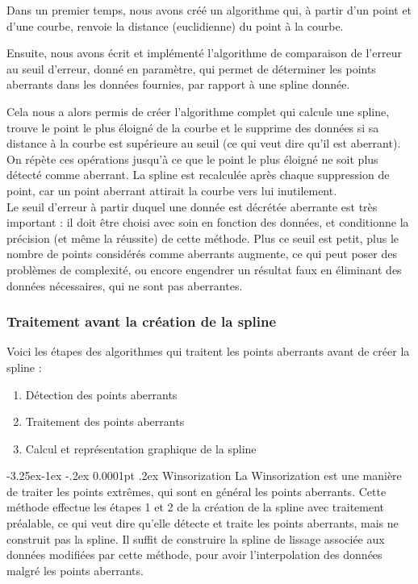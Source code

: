 \documentclass[a4paper,12pt]{article} %
\makeatletter
\renewcommand\paragraph{\@startsection{paragraph}{4}{\z@}%
                                      {-3.25ex\@plus -1ex \@minus -.2ex}%
                                      {0.0001pt \@plus .2ex}%
                                      {\normalfont\normalsize\bfseries}}
\makeatother
\begin{document}
			   
                Dans un premier temps, nous avons créé un algorithme qui, à partir d'un point et d'une courbe, renvoie la distance (euclidienne) du point à la courbe.
                
                Ensuite, nous avons écrit et implémenté l'algorithme de comparaison de l'erreur au seuil d'erreur, donné en paramètre, qui permet de déterminer les points aberrants dans les données fournies, par rapport à une spline donnée.
                
                Cela nous a alors permis de créer l'algorithme complet qui calcule une spline, trouve le point le plus éloigné de la courbe et le supprime des données si sa distance à la courbe est supérieure au seuil (ce qui veut dire qu'il est aberrant). On répète ces opérations jusqu'à ce que le point le plus éloigné ne soit plus détecté comme aberrant. La spline est recalculée après chaque suppression de point, car un point aberrant attirait la courbe vers lui inutilement.\\
                
                 Le seuil d'erreur à partir duquel une donnée est décrétée aberrante est très important : il doit être choisi avec soin en fonction des données, et conditionne la précision (et même la réussite) de cette méthode. Plus ce seuil est petit, plus le nombre de points considérés comme aberrants augmente, ce qui peut poser des problèmes de complexité, ou encore engendrer un résultat faux en éliminant des données nécessaires, qui ne sont pas aberrantes.
                
                
			\subsubsection{Traitement avant la création de la spline}
			    Voici les étapes des algorithmes qui traitent les points aberrants avant de créer la spline :
			    \begin{enumerate}
                    \item Détection des points aberrants
                    \item Traitement des points aberrants
                    \item Calcul et représentation graphique de la spline
			    \end{enumerate}
			    
				\paragraph{Winsorization}
				    La Winsorization est une manière de traiter les points extrêmes, qui sont en général les points aberrants. Cette méthode effectue les étapes 1 et 2 de la création de la spline avec traitement préalable, ce qui veut dire qu'elle détecte et traite les points aberrants, mais ne construit pas la spline. Il suffit de construire la spline de lissage associée aux données modifiées par cette méthode, pour avoir l'interpolation des données malgré les points aberrants.\\
				    
\end{document}

